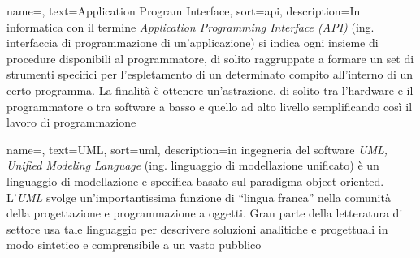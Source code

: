 




	
\renewcommand{\glossaryname}{Glossario}

{
    name=,
    text=Application Program Interface,
    sort=api,
    description={In informatica con il termine \emph{Application Programming Interface (API)} (ing. interfaccia di programmazione di un'applicazione) si indica ogni insieme di procedure disponibili al programmatore, di solito raggruppate a formare un set di strumenti specifici per l'espletamento di un determinato compito all'interno di un certo programma. La finalità è ottenere un'astrazione, di solito tra l'hardware e il programmatore o tra software a basso e quello ad alto livello semplificando così il lavoro di programmazione}
}

{
    name=,
    text=UML,
    sort=uml,
    description={in ingegneria del software \emph{UML, Unified Modeling Language} (ing. linguaggio di modellazione unificato) è un linguaggio di modellazione e specifica basato sul paradigma object-oriented. L'\emph{UML} svolge un'importantissima funzione di ``lingua franca'' nella comunità della progettazione e programmazione a oggetti. Gran parte della letteratura di settore usa tale linguaggio per descrivere soluzioni analitiche e progettuali in modo sintetico e comprensibile a un vasto pubblico}
}

